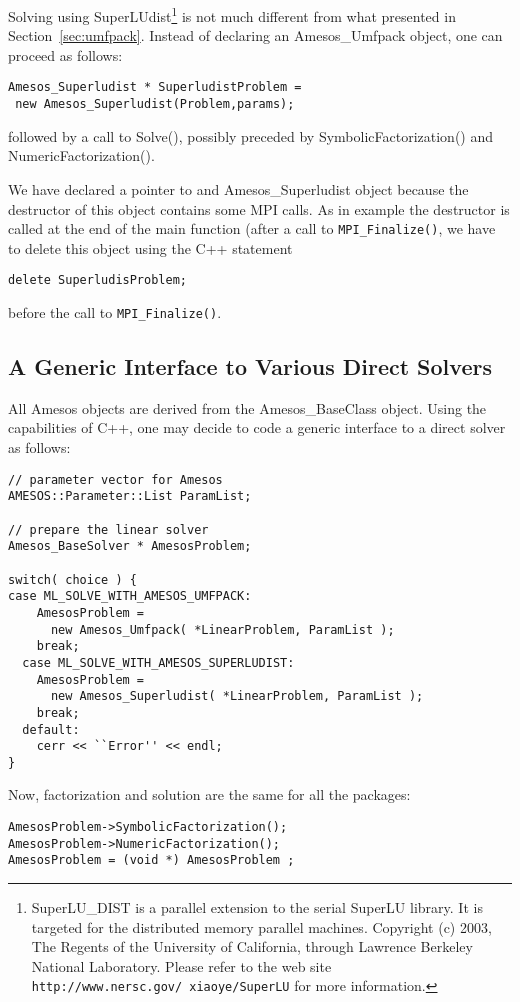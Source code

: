 Solving using SuperLUdist\footnote{SuperLU\_DIST is a parallel extension
  to the  serial SuperLU library.   It  is targeted for the  distributed
  memory parallel  machines. 
Copyright (c) 2003, The Regents of the University of California, through
Lawrence Berkeley National Laboratory.
Please refer
  to  the  web site {\tt  http://www.nersc.gov/~xiaoye/SuperLU} for more
  information.}  is not   much  different    from  what presented     in
Section~\ref{sec:umfpack}.    Instead of   declaring  an Amesos\_Umfpack
object, one can proceed as follows:
\begin{verbatim}
Amesos_Superludist * SuperludistProblem = 
 new Amesos_Superludist(Problem,params);
\end{verbatim}
followed by a call to Solve(), possibly preceded by
SymbolicFactorization() and NumericFactorization().

\begin{remark}
  We have declared a pointer to and Amesos\_Superludist object because
  the destructor of this object contains some MPI
  calls. As in example \newline {} the destructor is called
  at the end of the main function (after a call to
  \verb!MPI_Finalize()!, we have to delete this object using the C++
  statement
\begin{verbatim}
delete SuperludisProblem;
\end{verbatim}
  before the call to \verb!MPI_Finalize()!.
\end{remark}


\subsection{A Generic Interface to Various Direct Solvers}
\label{sec:amesos_generic}

All Amesos objects are derived from the Amesos\_BaseClass object. Using
the capabilities of C++, one may decide to code a generic interface to a
direct solver as follows:
\begin{verbatim}
// parameter vector for Amesos
AMESOS::Parameter::List ParamList;

// prepare the linear solver
Amesos_BaseSolver * AmesosProblem;

switch( choice ) {
case ML_SOLVE_WITH_AMESOS_UMFPACK:
    AmesosProblem = 
      new Amesos_Umfpack( *LinearProblem, ParamList );
    break;
  case ML_SOLVE_WITH_AMESOS_SUPERLUDIST:
    AmesosProblem = 
      new Amesos_Superludist( *LinearProblem, ParamList );
    break;
  default:
    cerr << ``Error'' << endl;
}
\end{verbatim}

Now, factorization and solution are the same for all the packages:
\begin{verbatim}  
AmesosProblem->SymbolicFactorization();
AmesosProblem->NumericFactorization();
AmesosProblem = (void *) AmesosProblem ;
\end{verbatim}


